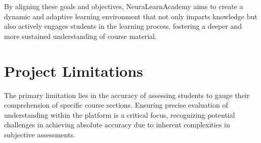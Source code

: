 By aligning these goals and objectives, NeuraLearnAcademy aims to create a dynamic and adaptive learning environment that not only imparts knowledge but also actively engages students in the learning process, fostering a deeper and more sustained understanding of course material.

\section{Project Limitations}

The primary limitation lies in the accuracy of assessing students to gauge their comprehension of specific course sections. Ensuring precise evaluation of understanding within the platform is a critical focus, recognizing potential challenges in achieving absolute accuracy due to inherent complexities in subjective assessments.


